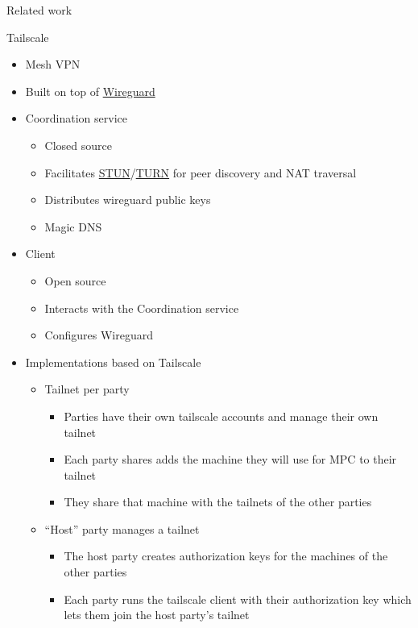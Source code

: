 \begin{frame}[fragile]{Related work}
\begin{block}{Tailscale}
\protect\hypertarget{tailscale}{}
\begin{itemize}
\tightlist
\item
  Mesh VPN
\item
  Built on top of \href{notes/02051-wireguard.md}{Wireguard}
\item
  Coordination service

  \begin{itemize}
  \tightlist
  \item
    Closed source
  \item
    Facilitates
    \href{notes/0202-nat\#Session\%20Traversal\%20Utilities\%20for\%20NAT\%20(STUN)}{STUN}/\href{notes/02021-internet-protocol.md\#test}{TURN}
    for peer discovery and NAT traversal
  \item
    Distributes wireguard public keys
  \item
    Magic DNS
  \end{itemize}
\item
  Client

  \begin{itemize}
  \tightlist
  \item
    Open source
  \item
    Interacts with the Coordination service
  \item
    Configures Wireguard
  \end{itemize}
\item
  Implementations based on Tailscale

  \begin{itemize}
  \tightlist
  \item
    Tailnet per party

    \begin{itemize}
    \tightlist
    \item
      Parties have their own tailscale accounts and manage their own
      tailnet
    \item
      Each party shares adds the machine they will use for MPC to their
      tailnet
    \item
      They share that machine with the tailnets of the other parties
    \end{itemize}
  \item
    ``Host'' party manages a tailnet

    \begin{itemize}
    \tightlist
    \item
      The host party creates authorization keys for the machines of the
      other parties
    \item
      Each party runs the tailscale client with their authorization key
      which lets them join the host party's tailnet
    \end{itemize}
  \end{itemize}
\end{itemize}
\end{block}


\end{frame}
